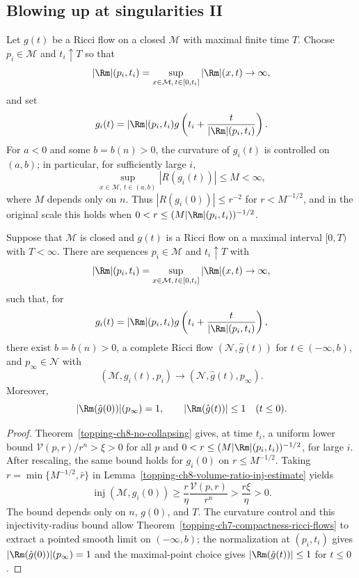 \subsection{Blowing up at singularities II}

Let $g(t)$ be a Ricci flow on a closed $\mathcal M$ with maximal finite time
$T$. Choose $p_i\in\mathcal M$ and $t_i\uparrow T$ so that
\[
|\Rm|(p_i,t_i)=\sup_{x\in\mathcal M,\,t\in[0,t_i]}|\Rm|(x,t)\to\infty,
\]
and set
\[
g_i(t)=|\Rm|(p_i,t_i)
g\left(t_i+\frac{t}{|\Rm|(p_i,t_i)}\right).
\]
For $a<0$ and some $b=b(n)>0$, the curvature of $g_i(t)$ is controlled on
$(a,b)$; in particular, for sufficiently large $i$,
\[
\sup_{x\in\mathcal M,\,t\in(a,b)}|R(g_i(t))|\leq M<\infty,
\]
where $M$ depends only on $n$. Thus $|R(g_i(0))|\leq r^{-2}$ for
$r<M^{-1/2}$, and in the original scale this holds when
$0<r\leq(M|\Rm|(p_i,t_i))^{-1/2}$.

\begin{theorem}
\label{topping-ch8-blow-up-singularities}
Suppose that $\mathcal M$ is closed and $g(t)$ is a Ricci flow on a maximal
interval $[0,T)$ with $T<\infty$. There are sequences $p_i\in\mathcal M$ and
$t_i\uparrow T$ with
\[
|\Rm|(p_i,t_i)=\sup_{x\in\mathcal M,\,t\in[0,t_i]}|\Rm|(x,t)\to\infty,
\]
such that, for
\[
g_i(t)=|\Rm|(p_i,t_i)
g\left(t_i+\frac{t}{|\Rm|(p_i,t_i)}\right),
\]
there exist $b=b(n)>0$, a complete Ricci flow $(\mathcal N,\hat g(t))$ for
$t\in(-\infty,b)$, and $p_\infty\in\mathcal N$ with
\[
(\mathcal M,g_i(t),p_i)\longrightarrow(\mathcal N,\hat g(t),p_\infty).
\]
Moreover,
\[
|\Rm(\hat g(0))|(p_\infty)=1,
\qquad |\Rm(\hat g(t))|\leq1\quad(t\leq0).
\]
\end{theorem}

\begin{proof}
\sketch Theorem~\ref{topping-ch8-no-collapsing} gives, at time $t_i$, a uniform lower bound
$\mathcal V(p,r)/r^n>\xi>0$ for all $p$ and
$0<r\leq(M|\Rm|(p_i,t_i))^{-1/2}$, for large $i$. After rescaling, the same
bound holds for $g_i(0)$ on $r\leq M^{-1/2}$. Taking
$r=\min\{M^{-1/2},\bar r\}$ in Lemma~\ref{topping-ch8-volume-ratio-inj-estimate} yields
\[
\operatorname{inj}(\mathcal M,g_i(0))
\geq\frac r\eta\frac{\mathcal V(p,r)}{r^n}
>\frac{r\xi}{\eta}>0.
\]
The bound depends only on $n$, $g(0)$, and $T$. The curvature control and this
injectivity-radius bound allow Theorem~\ref{topping-ch7-compactness-ricci-flows} to extract a pointed smooth limit
on $(-\infty,b)$; the normalization at $(p_i,t_i)$ gives
$|\Rm(\hat g(0))|(p_\infty)=1$ and the maximal-point choice gives
$|\Rm(\hat g(t))|\leq1$ for $t\leq0$.
\end{proof}
